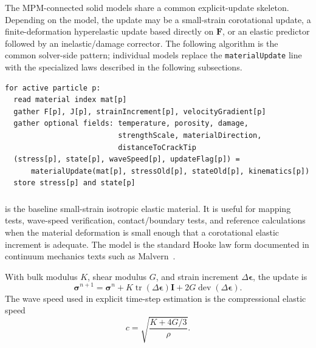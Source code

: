 The MPM-connected solid models share a common explicit-update skeleton.  Depending on the model, the update may be a small-strain corotational update, a finite-deformation hyperelastic update based directly on \(\mathbf{F}\), or an elastic predictor followed by an inelastic/damage corrector.  The following algorithm is the common solver-side pattern; individual models replace the \texttt{materialUpdate} line with the specialized laws described in the following subsections.

\begin{lstlisting}[caption={Common explicit MPM continuum material update pattern.},label={alg:continuum-material-dispatch},basicstyle=\ttfamily\small]
for active particle p:
  read material index mat[p]
  gather F[p], J[p], strainIncrement[p], velocityGradient[p]
  gather optional fields: temperature, porosity, damage,
                          strengthScale, materialDirection,
                          distanceToCrackTip
  (stress[p], state[p], waveSpeed[p], updateFlag[p]) =
      materialUpdate(mat[p], stressOld[p], stateOld[p], kinematics[p])
  store stress[p] and state[p]
\end{lstlisting}

\subsubsection{}
\label{subsubsec:elastic-isotropic-model}

 is the baseline small-strain isotropic elastic material.  It is useful for mapping tests, wave-speed verification, contact/boundary tests, and reference calculations when the material deformation is small enough that a corotational elastic increment is adequate.  The model is the standard Hooke law form documented in continuum mechanics texts such as Malvern~\cite{malvern1969}.

With bulk modulus \(K\), shear modulus \(G\), and strain increment \(\Delta\boldsymbol{\epsilon}\), the update is
\begin{equation}
  \boldsymbol{\sigma}^{n+1}
  = \boldsymbol{\sigma}^{n}
  + K\operatorname{tr}(\Delta\boldsymbol{\epsilon})\mathbf{I}
  + 2G\operatorname{dev}(\Delta\boldsymbol{\epsilon}).
  \label{eq:elastic-isotropic-update}
\end{equation}
The wave speed used in explicit time-step estimation is the compressional elastic speed
\begin{equation}
  c = \sqrt{\frac{K+4G/3}{\rho}} .
  \label{eq:elastic-isotropic-wavespeed}
\end{equation}

